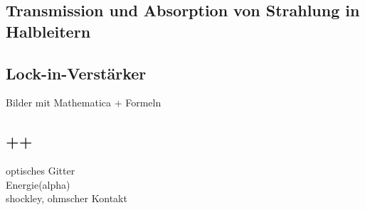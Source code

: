 \subsection{Transmission und Absorption von Strahlung in Halbleitern}

\subsection{Lock-in-Verstärker}


Bilder mit Mathematica + Formeln

\subsection{++}
optisches Gitter\\
Energie(alpha)\\
shockley, ohmscher Kontakt
